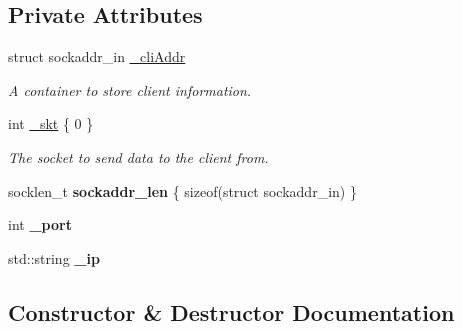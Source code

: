 \subsection*{Private Attributes}
\begin{DoxyCompactItemize}
\item 
struct sockaddr\+\_\+in \hyperlink{classconnector_1_1client_3_01UDP_01_4_ad60a6d56e9adfe9017aeb007f0274af3}{\+\_\+cli\+Addr}
\begin{DoxyCompactList}\small\item\em A container to store client information. \end{DoxyCompactList}\item 
\mbox{\label{classconnector_1_1client_3_01UDP_01_4_a9226ef6192c936cfce7d9979e4c6de7c}} 
int \hyperlink{classconnector_1_1client_3_01UDP_01_4_a9226ef6192c936cfce7d9979e4c6de7c}{\+\_\+skt} \{ 0 \}
\begin{DoxyCompactList}\small\item\em The socket to send data to the client from. \end{DoxyCompactList}\item 
\mbox{\label{classconnector_1_1client_3_01UDP_01_4_a2a71f10d88592e8dc3bcff0f916e17e3}} 
socklen\+\_\+t {\bfseries sockaddr\+\_\+len} \{ sizeof(struct sockaddr\+\_\+in) \}
\item 
\mbox{\label{classconnector_1_1client_3_01UDP_01_4_a533a6fdf332df1e9084a1a8c8e87d8e6}} 
int {\bfseries \+\_\+port}
\item 
\mbox{\label{classconnector_1_1client_3_01UDP_01_4_af7d032e8ad04f9e365f94d256b85c91e}} 
std\+::string {\bfseries \+\_\+ip}
\end{DoxyCompactItemize}


\subsection{Constructor \& Destructor Documentation}
\mbox{\label{classconnector_1_1client_3_01UDP_01_4_ac0fe47fc2a027af240d0d812c0bfc386}} 

